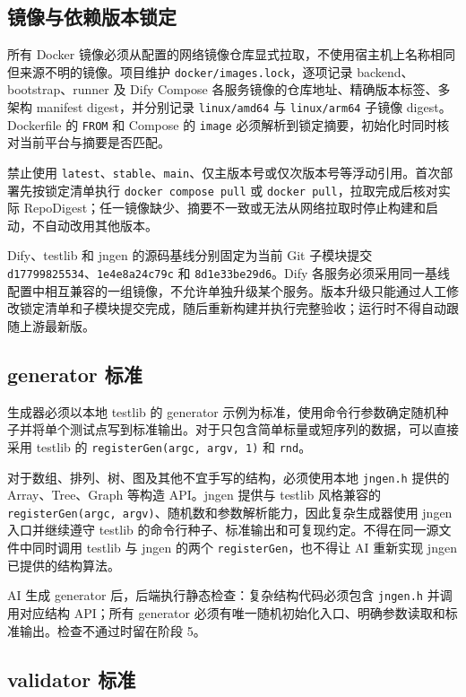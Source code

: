 \documentclass[UTF8,zihao=-4]{ctexart}
\begin{document}
\subsection{镜像与依赖版本锁定}

所有 Docker 镜像必须从配置的网络镜像仓库显式拉取，不使用宿主机上名称相同但来源不明的镜像。项目维护 \texttt{docker/images.lock}，逐项记录 backend、bootstrap、runner 及 Dify Compose 各服务镜像的仓库地址、精确版本标签、多架构 manifest digest，并分别记录 \texttt{linux/amd64} 与 \texttt{linux/arm64} 子镜像 digest。Dockerfile 的 \texttt{FROM} 和 Compose 的 \texttt{image} 必须解析到锁定摘要，初始化时同时核对当前平台与摘要是否匹配。

禁止使用 \texttt{latest}、\texttt{stable}、\texttt{main}、仅主版本号或仅次版本号等浮动引用。首次部署先按锁定清单执行 \texttt{docker compose pull} 或 \texttt{docker pull}，拉取完成后核对实际 RepoDigest；任一镜像缺少、摘要不一致或无法从网络拉取时停止构建和启动，不自动改用其他版本。

Dify、testlib 和 jngen 的源码基线分别固定为当前 Git 子模块提交 \texttt{d17799825534}、\texttt{1e4e8a24c79c} 和 \texttt{8d1e33be29d6}。Dify 各服务必须采用同一基线配置中相互兼容的一组镜像，不允许单独升级某个服务。版本升级只能通过人工修改锁定清单和子模块提交完成，随后重新构建并执行完整验收；运行时不得自动跟随上游最新版。

\subsection{generator 标准}

生成器必须以本地 testlib 的 generator 示例为标准，使用命令行参数确定随机种子并将单个测试点写到标准输出。对于只包含简单标量或短序列的数据，可以直接采用 testlib 的 \texttt{registerGen(argc, argv, 1)} 和 \texttt{rnd}。

对于数组、排列、树、图及其他不宜手写的结构，必须使用本地 \texttt{jngen.h} 提供的 Array、Tree、Graph 等构造 API。jngen 提供与 testlib 风格兼容的 \texttt{registerGen(argc, argv)}、随机数和参数解析能力，因此复杂生成器使用 jngen 入口并继续遵守 testlib 的命令行种子、标准输出和可复现约定。不得在同一源文件中同时调用 testlib 与 jngen 的两个 \texttt{registerGen}，也不得让 AI 重新实现 jngen 已提供的结构算法。

AI 生成 generator 后，后端执行静态检查：复杂结构代码必须包含 \texttt{jngen.h} 并调用对应结构 API；所有 generator 必须有唯一随机初始化入口、明确参数读取和标准输出。检查不通过时留在阶段 5。

\subsection{validator 标准}
\end{document}
